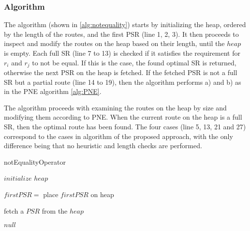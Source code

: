 \subsubsection{Algorithm}
\label{sec:algortihmNEO}
The algorithm (shown in \ref{alg:notequality}) starts by initializing the heap, ordered by the length of the routes, and the first PSR (line 1, 2, 3). It then proceeds to inspect and modify the routes on the heap based on their length, until the $heap$ is empty. Each full SR (line 7 to 13) is checked if it satisfies the requirement for $r_i$ and $r_j$ to not be equal. If this is the case, the found optimal SR is returned, otherwise the next PSR on the heap is fetched. If the fetched PSR is not a full SR but a partial route (line 14 to 19), then the algorithm performs a) and b) as in the PNE algorithm \ref{alg:PNE}.

The algorithm proceeds with examining the routes on the heap by size and modifying them according to PNE. When the current route on the heap is a full SR, then the optimal route has been found. The four cases (line 5, 13, 21 and 27) correspond to the cases in algorithm of the proposed approach, with the only difference being that no heuristic and length checks are performed. 

\begin{algorithm}[H]
	\label{alg:notequality}
	\caption{notEqualityOperator}
	
	\BlankLine
	
	$initialize$ $heap$\; 
	
	$firstPSR =$\;
	place $firstPSR$ on heap\;
	
	\BlankLine
	
	
	fetch a $PSR$ from the $heap$\;

	\Return $null$\;
	
	
\end{algorithm}

